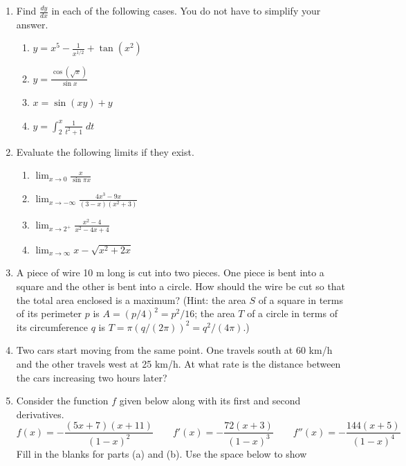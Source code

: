 \documentclass[12pt]{article}
\newcommand{\ds}{\displaystyle}
\begin{document}
\begin{enumerate}
\item Find
  $\ds \frac{dy}{dx}$ in each of the following cases.
  You do not have to simplify your answer.
  \begin{enumerate}
  \item $\ds y = x^5 - \frac{1}{x^{1/2}} + \tan(x^2)$
\vfill
  \item $\ds y = \frac{\cos(\sqrt{x})}{\sin x}$
\vfill
  \item $\ds x=\sin\left(xy\right)+y$
\vfill
  \item $\ds y=\int_2^{x} \frac{1}{t^2+1} \; dt$
\vfill
  \end{enumerate}
\newpage
\item Evaluate
  the following limits if they exist.
  \begin{enumerate}
  \item $\ds \lim_{x\to 0} \frac{x}{\sin \pi x}$
\vfill
  \item $\ds \lim_{x\to -\infty} \frac{4x^3-9x}{(3-x)(x^2+3)}$
\vfill
  \item $\ds \lim_{x\to 2^+} \frac{x^2-4}{x^2-4x+4}$
\vfill
  \item $\ds \lim_{x\to \infty} x-\sqrt{x^2+2x}$
\vfill
  \end{enumerate}
\newpage
\item A 
  piece of wire 10 m long is cut into two pieces.  One piece is bent
  into a square and the other is bent into a circle.  How should the wire
  be cut so that the total area enclosed is a maximum?  (Hint: the area $S$ of
  a square in terms of its perimeter $p$ is $A=(p/4)^2=p^2/16$; 
  the area $T$ of a circle in terms of its circumference $q$ 
  is $T=\pi(q/(2\pi))^2=q^2/(4\pi)$.)
\vfill
\newpage
\item Two cars start moving from the same
  point.  One travels south at 60 km/h and the other travels west at 25
  km/h.  At what rate is the distance between the cars increasing two
  hours later?
\vfill
\newpage
\item Consider the function $f$ given below
  along with its first and second derivatives.
  \begin{displaymath}
    f(x) = -\frac{(5x+7)(x+11)}{(1-x)^2}
    \qquad
    f'(x) = -\frac{72(x+3)}{(1-x)^3}
    \qquad
    f''(x) = -\frac{144(x+5)}{(1-x)^4}
  \end{displaymath}
  Fill in the blanks for parts (a) and (b).  Use the space below to show

\end{enumerate}
\end{document}
